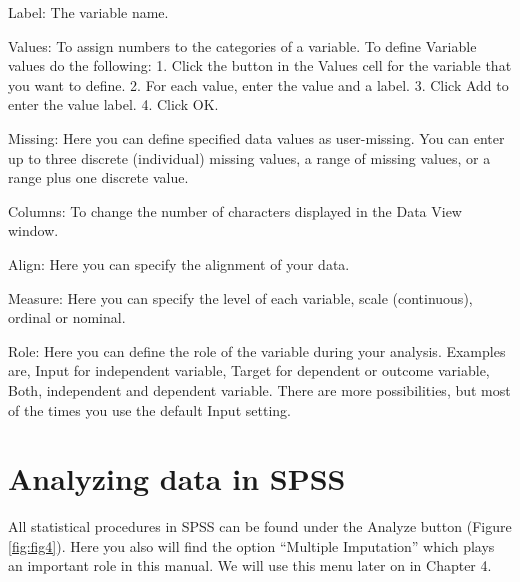\documentclass[]{book}
\begin{document}
Label: The variable name.

Values: To assign numbers to the categories of a variable. To define
Variable values do the following: 1. Click the button in the Values cell
for the variable that you want to define. 2. For each value, enter the
value and a label. 3. Click Add to enter the value label. 4. Click OK.

Missing: Here you can define specified data values as user-missing. You
can enter up to three discrete (individual) missing values, a range of
missing values, or a range plus one discrete value.

Columns: To change the number of characters displayed in the Data View
window.

Align: Here you can specify the alignment of your data.

Measure: Here you can specify the level of each variable, scale
(continuous), ordinal or nominal.

Role: Here you can define the role of the variable during your analysis.
Examples are, Input for independent variable, Target for dependent or
outcome variable, Both, independent and dependent variable. There are
more possibilities, but most of the times you use the default Input
setting.

\section{Analyzing data in SPSS}\label{analyzing-data-in-spss}

All statistical procedures in SPSS can be found under the Analyze button
(Figure \ref{fig:fig4}). Here you also will find the option ``Multiple
Imputation'' which plays an important role in this manual. We will use
this menu later on in Chapter 4.
\end{document}
